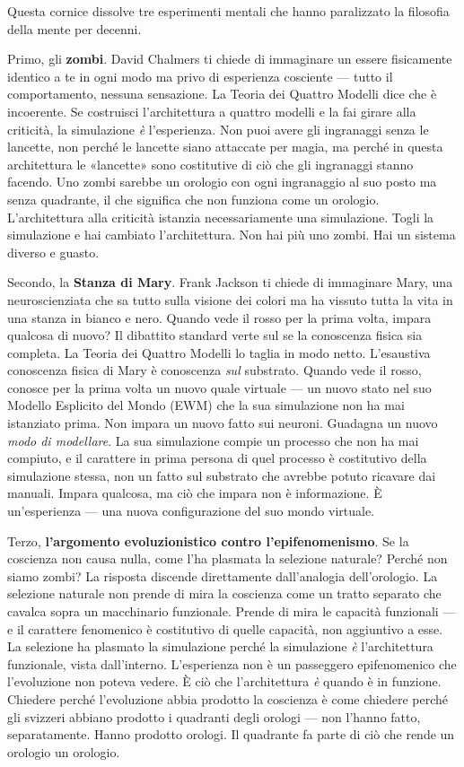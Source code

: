 \documentclass[11pt, twoside, openright]{book}
\begin{document}
Questa cornice dissolve tre esperimenti mentali che hanno paralizzato la filosofia della mente per decenni.

Primo, gli \textbf{zombi}. David Chalmers ti chiede di immaginare un essere fisicamente identico a te in ogni modo ma privo di esperienza cosciente --- tutto il comportamento, nessuna sensazione. La Teoria dei Quattro Modelli dice che è incoerente. Se costruisci l'architettura a quattro modelli e la fai girare alla criticità, la simulazione \textit{è} l'esperienza. Non puoi avere gli ingranaggi senza le lancette, non perché le lancette siano attaccate per magia, ma perché in questa architettura le «lancette» sono costitutive di ciò che gli ingranaggi stanno facendo. Uno zombi sarebbe un orologio con ogni ingranaggio al suo posto ma senza quadrante, il che significa che non funziona come un orologio. L'architettura alla criticità istanzia necessariamente una simulazione. Togli la simulazione e hai cambiato l'architettura. Non hai più uno zombi. Hai un sistema diverso e guasto.

Secondo, la \textbf{Stanza di Mary}. Frank Jackson ti chiede di immaginare Mary, una neuroscienziata che sa tutto sulla visione dei colori ma ha vissuto tutta la vita in una stanza in bianco e nero. Quando vede il rosso per la prima volta, impara qualcosa di nuovo? Il dibattito standard verte sul se la conoscenza fisica sia completa. La Teoria dei Quattro Modelli lo taglia in modo netto. L'esaustiva conoscenza fisica di Mary è conoscenza \textit{sul} substrato. Quando vede il rosso, conosce per la prima volta un nuovo quale virtuale --- un nuovo stato nel suo Modello Esplicito del Mondo (EWM) che la sua simulazione non ha mai istanziato prima. Non impara un nuovo fatto sui neuroni. Guadagna un nuovo \textit{modo di modellare}. La sua simulazione compie un processo che non ha mai compiuto, e il carattere in prima persona di quel processo è costitutivo della simulazione stessa, non un fatto sul substrato che avrebbe potuto ricavare dai manuali. Impara qualcosa, ma ciò che impara non è informazione. È un'esperienza --- una nuova configurazione del suo mondo virtuale.

Terzo, \textbf{l'argomento evoluzionistico contro l'epifenomenismo}. Se la coscienza non causa nulla, come l'ha plasmata la selezione naturale? Perché non siamo zombi? La risposta discende direttamente dall'analogia dell'orologio. La selezione naturale non prende di mira la coscienza come un tratto separato che cavalca sopra un macchinario funzionale. Prende di mira le capacità funzionali --- e il carattere fenomenico è costitutivo di quelle capacità, non aggiuntivo a esse. La selezione ha plasmato la simulazione perché la simulazione \textit{è} l'architettura funzionale, vista dall'interno. L'esperienza non è un passeggero epifenomenico che l'evoluzione non poteva vedere. È ciò che l'architettura \textit{è} quando è in funzione. Chiedere perché l'evoluzione abbia prodotto la coscienza è come chiedere perché gli svizzeri abbiano prodotto i quadranti degli orologi --- non l'hanno fatto, separatamente. Hanno prodotto orologi. Il quadrante fa parte di ciò che rende un orologio un orologio.
\end{document}
